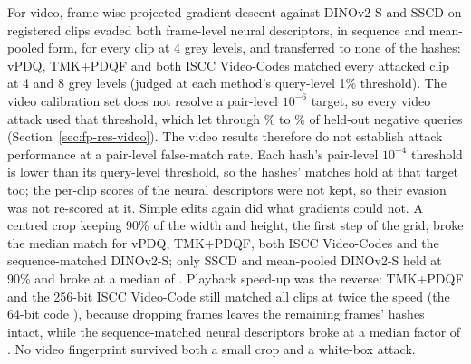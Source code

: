 For video, frame-wise projected gradient descent against DINOv2-S and SSCD on  registered clips evaded both frame-level neural descriptors, in sequence and mean-pooled form, for every clip at 4 grey levels, and transferred to none of the hashes: vPDQ, TMK+PDQF and both ISCC Video-Codes matched every attacked clip at 4 and 8 grey levels (judged at each method's query-level 1\% threshold). The video calibration set does not resolve a pair-level $10^{-6}$ target, so every video attack used that threshold, which let through \% to \% of held-out negative queries (Section~\ref{sec:fp-res-video}). The video results therefore do not establish attack performance at a pair-level false-match rate. Each hash's pair-level $10^{-4}$ threshold is lower than its query-level threshold, so the hashes' matches hold at that target too; the per-clip scores of the neural descriptors were not kept, so their evasion was not re-scored at it. Simple edits again did what gradients could not. A centred crop keeping 90\% of the width and height, the first step of the grid, broke the median match for vPDQ, TMK+PDQF, both ISCC Video-Codes and the sequence-matched DINOv2-S; only SSCD and mean-pooled DINOv2-S held at 90\% and broke at a median of . Playback speed-up was the reverse: TMK+PDQF and the 256-bit ISCC Video-Code still matched all  clips at twice the speed (the 64-bit code ), because dropping frames leaves the remaining frames' hashes intact, while the sequence-matched neural descriptors broke at a median factor of . No video fingerprint survived both a small crop and a white-box attack.
